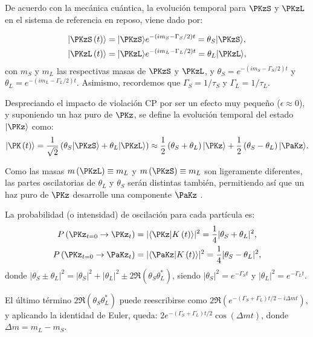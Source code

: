 De acuerdo con la mecánica cuántica, la evolución temporal para $\PKzS$ y $\PKzL$ en el sistema de referencia en reposo, viene dado por:

\begin{align}
|\PKzS\left(t\right)\rangle &= |\PKzS\rangle e^{-\left(im_{S}-\Gamma_{S}/2\right)t} = \theta_{S}|\PKzS\rangle , \\
|\PKzL\left(t\right)\rangle &= |\PKzL\rangle e^{-\left(im_{L}-\Gamma_{L}/2\right)t} = \theta_{L}|\PKzL\rangle , \label{eq:evtempKSKL}
\end{align}
con $m_{S}$ y $m_{L}$ las respectivas masas de $\PKzS$ y $\PKzL$, y $\theta_{S}=e^{-\left(im_{S}-\Gamma_{S}/2\right)t}$ y $\theta_{L}=e^{-\left(im_{L}-\Gamma_{L}/2\right)t}$. Asimismo, recordemos que $\Gamma_{S}=1/ \tau_S$ y $\Gamma_{L}=1/\tau_L$. 

Despreciando el impacto de violación CP por ser un efecto muy pequeño ($\epsilon \approx 0$), y suponiendo un haz puro de $\PKz$, se define la evolución temporal del estado $|\PKz\rangle$ como:
\begin{equation}
|\PK\left(t\right)\rangle=\dfrac{1}{\sqrt{2}}\left(\theta_{S}|\PKzS\rangle + \theta_{L}|\PKzL\rangle \right) \approx \dfrac{1}{2}\left(\theta_{S}+\theta_{L}\right)|\PKz\rangle + \dfrac{1}{2}\left(\theta_{S}-\theta_{L}\right)|\PaKz\rangle .
\end{equation}

Como las masas $m\left(\PKzL\right) \equiv m_{L}$ y $m\left(\PKzS\right) \equiv m_{L}$ son ligeramente diferentes, las partes oscilatorias de $\theta_{L}$ y $\theta_{S}$ serán distintas también, permitiendo así que un haz puro de $\PKz$ desarrolle una componente $\PaKz$ \cite{Thomson}.

La probabilidad (o intensidad) de oscilación para cada partícula es:
\begin{align}
P\left(\PKz_{t=0} \rightarrow \PKz_{t}\right)&= |\langle\PKz|K\left(t\right)\rangle|^2 =\dfrac{1}{4}|\theta_{S}+\theta_{L}|^2 ,\label{eq:prob1osci}\\
P\left(\PKz_{t=0} \rightarrow \PaKz_{t}\right)&= |\langle\PaKz|K\left(t\right)\rangle|^2 =\dfrac{1}{4}|\theta_{S}-\theta_{L}|^2 ,\label{eq:prob2osci}
\end{align}
donde $|\theta_{S} \pm \theta_{L}|^2=|\theta_{S}|^2+|\theta_{L}|^2 \pm 2\Re\left(\theta_{S}\theta_{L}^{\ast}\right)$, siendo $|\theta_{S}|^2=e^{-\Gamma_{S} t}$ y $|\theta_{L}|^2=e^{-\Gamma_{L} t}$. 

El último término $2\Re\left(\theta_{S}\theta_{L}^{\ast}\right)$ puede reescribirse como $2\Re\left(e^{-\left(\Gamma_{S}+\Gamma_{L}\right)t/2-i\Delta mt}\right)$, y aplicando la identidad de Euler, queda: $2e^{-\left(\Gamma_{S}+\Gamma_{L}\right)t/2} \cos \left(\Delta mt\right)$, donde $\Delta m = m_{L}-m_{S}$.

